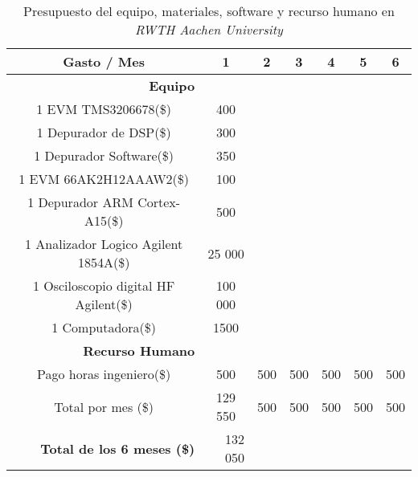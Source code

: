 \newpage

\begin{table}[ht]
\caption{Presupuesto del equipo, materiales, software y recurso humano en \textit{RWTH Aachen University}}
  \centering
  \begin{tabular}{| c | c | c | c | c | c | c |}
  \hline\hline
   Gasto / Mes 			& 1 & 2 & 3 & 4 & 5 & 6 			\\ \hline\hline
   \multicolumn{1}{|r}{\textbf{Equipo}} & \multicolumn{1}{r}{} & \multicolumn{1}{r}{} & \multicolumn{1}{r}{} & \multicolumn{1}{r}{} & \multicolumn{1}{r}{} & \multicolumn{1}{r|}{} \\ \hline
   1 EVM TMS3206678(\$)		& 400 & \multicolumn{1}{r}{} & \multicolumn{1}{r}{} & \multicolumn{1}{r}{} & \multicolumn{1}{r}{} & \multicolumn{1}{r|}{} \\ \hline 
   1 Depurador de DSP(\$)	& 300 & \multicolumn{1}{r}{} & \multicolumn{1}{r}{} & \multicolumn{1}{r}{} & \multicolumn{1}{r}{} & \multicolumn{1}{r|}{} \\ \hline
   1 Depurador Software(\$)	& 350 & \multicolumn{1}{r}{} & \multicolumn{1}{r}{} & \multicolumn{1}{r}{} & \multicolumn{1}{r}{} & \multicolumn{1}{r|}{} \\ \hline
   1 EVM 66AK2H12AAAW2(\$)	& 100 & \multicolumn{1}{r}{} & \multicolumn{1}{r}{} & \multicolumn{1}{r}{} & \multicolumn{1}{r}{} & \multicolumn{1}{r|}{} \\ \hline
   1 Depurador ARM Cortex-A15(\$) & 500 & \multicolumn{1}{r}{} & \multicolumn{1}{r}{} & \multicolumn{1}{r}{} & \multicolumn{1}{r}{} & \multicolumn{1}{r|}{} \\ \hline
   1 Analizador Logico Agilent 1854A(\$) & 25 000 & \multicolumn{1}{r}{} & \multicolumn{1}{r}{} & \multicolumn{1}{r}{} & \multicolumn{1}{r}{} & \multicolumn{1}{r|}{} \\ \hline
   1 Osciloscopio digital HF Agilent(\$) & 100 000 & \multicolumn{1}{r}{} & \multicolumn{1}{r}{} & \multicolumn{1}{r}{} & \multicolumn{1}{r}{} & \multicolumn{1}{r|}{} \\ \hline
   1 Computadora(\$)		& 1500 & \multicolumn{1}{r}{} & \multicolumn{1}{r}{} & \multicolumn{1}{r}{} & \multicolumn{1}{r}{} & \multicolumn{1}{r|}{} \\ \hline
   \multicolumn{1}{|r}{\textbf{Recurso Humano}} & \multicolumn{1}{r}{} & \multicolumn{1}{r}{} & \multicolumn{1}{r}{} & \multicolumn{1}{r}{} & \multicolumn{1}{r}{} & \multicolumn{1}{r|}{} \\ \hline
   Pago horas ingeniero(\$)    & 500 & 500 & 500 & 500 & 500 & \multicolumn{1}{r|}{500} \\ \hline
   Total por mes (\$)		& 129 550 & 500 & 500 & 500 & 500 & \multicolumn{1}{r|}{500} \\ \hline
   \multicolumn{1}{|r}{\textbf{Total de los 6 meses (\$)}} & \multicolumn{1}{|r}{132 050} & \multicolumn{1}{r}{} & \multicolumn{1}{r}{} & \multicolumn{1}{r}{} & \multicolumn{1}{r}{} & \multicolumn{1}{r|}{} \\ \hline\hline
   
  \end{tabular}
  \label{tab:Presupuesto del equipo, materiales, software y recurso humano en RWTH Aachen University}
 
 
\end{table}

